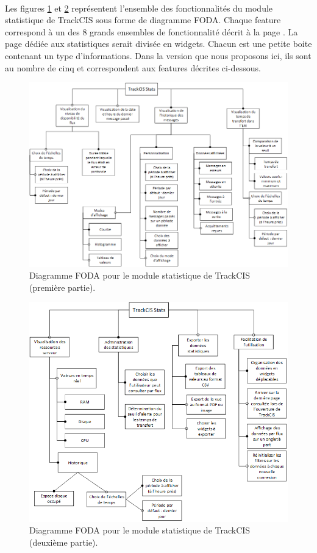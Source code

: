 			\paragraph{}
			Les figures \ref{foda_1} et \ref{foda_2} représentent l'ensemble des
			fonctionnalités du module statistique de TrackCIS sous forme de diagramme FODA.
			Chaque feature correspond à un des 8 grands ensembles de fonctionnalité décrit à
			la page \pageref{ensembles_fonctios}.\newline
			La page dédiée aux statistiques serait divisée en widgets. Chacun est une
			petite boite contenant un type d'informations. Dans la version que nous proposons ici,
			ils sont au nombre de cinq et correspondent aux features décrites ci-dessous.
			\begin{figure}[H]%
				\centering
				\includegraphics[width=16cm]{../img/part2/foda_1.png}
				\caption{\label{foda_1} Diagramme FODA pour le module statistique de
				TrackCIS (première partie).}
			\end{figure}
			\begin{figure}[H]%
				\centering
				\includegraphics[width=16cm]{../img/part2/foda_2.png}
				\caption{\label{foda_2} Diagramme FODA pour le module statistique de
				TrackCIS (deuxième partie).}
			\end{figure}
			
